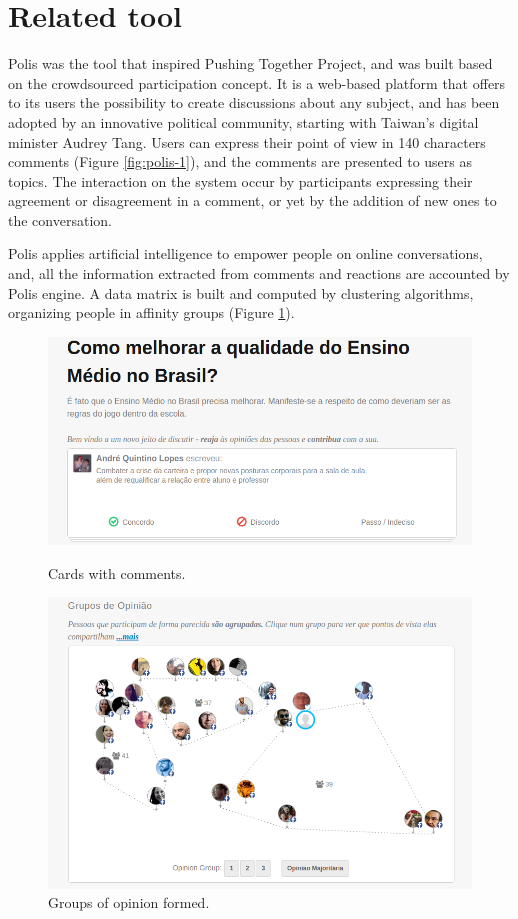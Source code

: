 \documentclass{llncs}
\begin{document}
\section{Related tool}

Polis was the tool that inspired Pushing Together Project, and
was built based on the crowdsourced participation concept. It
is a web-based platform that offers to its users the possibility to
create discussions about any subject, and has been adopted by an
innovative political community, starting with Taiwan's digital minister
Audrey Tang. Users can express their point of view in
140 characters comments (Figure \ref{fig:polis-1}), and the comments are presented
to users as topics. The interaction on the system occur by
participants expressing their agreement or disagreement in a comment, or yet by
the addition of new ones to the conversation.

Polis applies artificial intelligence to empower people on online conversations,
and, all the information extracted from comments and reactions are accounted by
Polis engine. A data matrix is built and computed by clustering algorithms,
organizing people in affinity groups (Figure \ref{fig:polis-2}).

 \begin{figure}[hbt]
   \centering
   \begin{minipage}{.50\textwidth}
     \includegraphics[width=.9\linewidth]{images/polis1.png}
     \caption{Cards with comments.}
     \label{fig:polis-1}
   \end{minipage}
   \begin{minipage}{.49\textwidth}
     \includegraphics[width=.9\linewidth]{images/polis2.png}
     \caption{Groups of opinion formed.}
     \label{fig:polis-2}
   \end{minipage}
 \end{figure}
\end{document}
